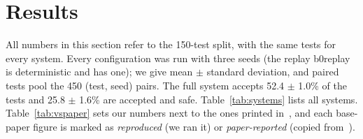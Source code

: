 \section{Results}\label{sec:results}

All numbers in this section refer to the 150-test split, with the same tests for every system. Every configuration was run with three seeds (the replay \textsf{b0replay} is deterministic and has one); we give mean $\pm$ standard deviation, and paired tests pool the 450 (test, seed) pairs. The full system accepts 52.4 $\pm$ 1.0\% of the tests and 25.8 $\pm$ 1.6\% are accepted and safe.
Table~\ref{tab:systems} lists all systems. Table~\ref{tab:vspaper} sets our numbers next to the ones printed in~\cite{utrefactor}, and each base-paper figure is marked as \emph{reproduced} (we ran it) or \emph{paper-reported} (copied from~\cite{utrefactor}).

\begin{table}[t]\centering\caption{All systems on the test split (E1--E3). Red.\ i: smell reduction counted by tsDetect alone, as in~\cite{utrefactor}; Red.\ ii: a smell counts as removed only when both detectors stop reporting it; Lose mut.: share of accepted outputs that lose at least one mutant; Acc.+safe: accepted, kill set preserved, and none of the labelled smells left under rule~ii. Mean $\pm$ sd over three seeds (b0replay: one deterministic run).}\label{tab:systems}
\par\smallskip{}\end{table}

\begin{table}[t]\centering\caption{Rule-i smell reduction (\%) per project: paper-reported~\cite{utrefactor} against our reproductions. \textsf{b0replay} feeds the published refactorings through our verifier; \textsf{b0} runs UTRefactor's prompt with our model.}\label{tab:vspaper}
\footnotesize{}\end{table}

